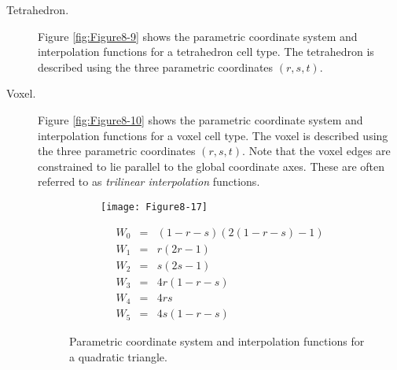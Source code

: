 \begin{description}
    \item[Tetrahedron.] Figure \ref{fig:Figure8-9} shows the parametric coordinate system and interpolation functions for a tetrahedron cell type. The tetrahedron is described using the three parametric coordinates $(r,s,t)$.

    \item[Voxel.] Figure \ref{fig:Figure8-10} shows the parametric coordinate system and interpolation functions for a voxel cell type. The voxel is described using the three parametric coordinates $(r,s,t)$. Note that the voxel edges are constrained to lie parallel to the global coordinate axes. These are often referred to as \emph{trilinear interpolation} functions.

    \begin{figure}[!htb]
        \centering
        \begin{subfigure}{0.48\linewidth}
            \centering
            \texttt{[image: Figure8-17]}
            \caption*{}
        \end{subfigure}
        \hfill
        \begin{subfigure}{0.48\linewidth}
            \centering
            \begin{equation*}
            \begin{array}{lll}
            W_0 &=& (1 - r - s)(2(1 - r - s) - 1) \\
            W_1 &=& r (2 r - 1) \\
            W_2 &=& s(2s - 1) \\
            W_3 &=& 4 r (1 - r - s) \\
            W_4 &=& 4 r s \\
            W_5 &=& 4 s (1 - r - s)
            \end{array}
            \end{equation*}
        \end{subfigure}%
        \caption{Parametric coordinate system and interpolation functions for a quadratic triangle.}
        \label{fig:Figure8-17}
    \end{figure}


\end{description}
